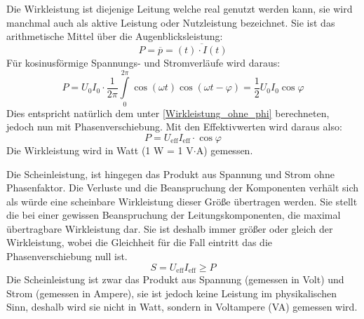 Die Wirkleistung ist diejenige Leitung welche real genutzt werden kann, sie wird manchmal auch als aktive Leistung oder Nutzleistung bezeichnet. Sie ist das arithmetische Mittel über die Augenblicksleistung:
\begin{equation}
P = \overline{p} = \overline{(t) \cdot I(t)}
\end{equation}
Für kosinusförmige Spannungs- und Stromverläufe wird daraus:
\begin{equation}
P = U_0 I_0 \cdot \frac{1}{2\pi} \int\limits_0^{2\pi} \cos\left( \omega t\right) \cos \left(\omega t - \varphi\right)
= \frac{1}{2} U_0 I_0 \cos \varphi
\end{equation}
Dies entspricht natürlich dem unter \ref{Wirkleistung_ohne_phi} berechneten, jedoch nun mit Phasenverschiebung. Mit den Effektivwerten wird daraus also:
\begin{equation}
P =  U_{\mathrm{eff}} I_{\mathrm{eff}} \cdot \cos \varphi
\end{equation}
Die Wirkleistung wird in Watt (1 W = 1 V$\cdot$A) gemessen.

Die Scheinleistung, ist hingegen das Produkt aus Spannung und Strom ohne Phasenfaktor. Die Verluste und die Beanspruchung der Komponenten verhält sich als würde eine scheinbare Wirkleistung dieser Größe übertragen werden. Sie stellt die bei einer gewissen Beanspruchung der Leitungskomponenten, die maximal übertragbare Wirkleistung dar. Sie ist deshalb immer größer oder gleich der Wirkleistung, wobei die Gleichheit für die Fall eintritt das die Phasenverschiebung null ist.
\begin{equation}
S = U_{\mathrm{eff}} I_{\mathrm{eff}} \geq P
\end{equation}
Die Scheinleistung ist zwar das Produkt aus Spannung (gemessen in Volt) und Strom (gemessen in Ampere), sie ist jedoch keine Leistung im physikalischen Sinn, deshalb wird sie nicht in Watt, sondern in Voltampere (VA) gemessen wird.

